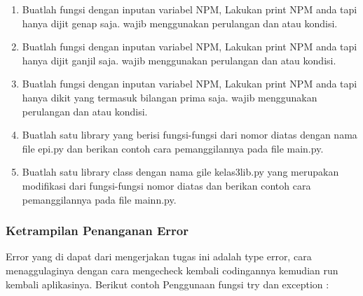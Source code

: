 \begin{enumerate}
    \item Buatlah fungsi dengan inputan variabel NPM, Lakukan print NPM anda tapi hanya dijit genap saja. wajib menggunakan perulangan dan atau kondisi.
        

    \item Buatlah fungsi dengan inputan variabel NPM, Lakukan print NPM anda tapi hanya dijit ganjil saja. wajib menggunakan perulangan dan atau kondisi.
        

    \item Buatlah fungsi dengan inputan variabel NPM, Lakukan print NPM anda tapi hanya dikit yang termasuk bilangan prima saja. wajib menggunakan perulangan dan atau kondisi.
        

    \item Buatlah satu library yang berisi fungsi-fungsi dari nomor diatas dengan nama file epi.py dan berikan contoh cara pemanggilannya pada file main.py.
        

    \item Buatlah satu library class dengan nama gile kelas3lib.py yang merupakan modifikasi dari fungsi-fungsi nomor diatas dan berikan contoh cara pemanggilannya pada file mainn.py.
        

\end{enumerate}

\subsubsection{Ketrampilan Penanganan Error}
Error yang di dapat dari mengerjakan tugas ini adalah type error, cara menaggulaginya dengan cara mengecheck kembali codingannya
kemudian run kembali aplikasinya. Berikut contoh Penggunaan fungsi try dan exception :
 
